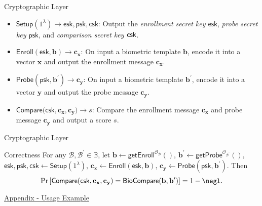\begin{frame}{Cryptographic Layer}

\pause
\begin{itemize}

	\item $\textsf{Setup}(1^\lambda) \to \textsf{esk}, \textsf{psk}, \textsf{csk}$: Output the \emph{enrollment secret key $\textsf{esk}$}, \emph{probe secret key $\textsf{psk}$}, and \emph{comparison secret key $\sf csk$}.
	\pause

	\item $\textsf{Enroll}(\textsf{esk}, \mathbf{b}) \to \mathbf{c_x}$: On input a biometric template $\mathbf{b}$, encode it into a vector $\mathbf{x}$ and output the enrollment message $\mathbf{c_x}$.
	\pause

	\item $\textsf{Probe}(\textsf{psk}, \mathbf{b}^\prime) \to \mathbf{c_y}$: On input a biometric template $\mathbf{b}^\prime$, encode it into a vector $\mathbf{y}$ and output the probe message $\mathbf{c_y}$.
	\pause

	\item $\textsf{Compare}(\textsf{csk}, \mathbf{c_x}, \mathbf{c_y)} \to s$: Compare the enrollment message $\mathbf{c_x}$ and probe message $\mathbf{c_y}$ and output a score $s$.

\end{itemize}

\end{frame}


\begin{frame}{Cryptographic Layer}

\begin{block}{Correctness} 
For any $\mathcal{B}, \mathcal{B}^\prime \in \mathbb{B}$, \pause
let $\mathbf{b} \gets \textsf{getEnroll}^{\mathcal{O}_\mathcal{B}}()$, $\mathbf{b}^\prime \gets \textsf{getProbe}^{\mathcal{O}_{\mathcal{B}^\prime}}()$, \pause
$\textsf{esk}, \textsf{psk}, \textsf{csk} \gets \textsf{Setup}(1^\lambda)$,
$\mathbf{c_x} \gets \textsf{Enroll}(\textsf{esk}, \mathbf{b})$,
$\mathbf{c_y} \gets \textsf{Probe}(\textsf{psk}, \mathbf{b}^\prime)$.
\pause
Then
	\[
		\Pr \left [
			\textsf{Compare}(\textsf{csk}, \mathbf{c_x}, \mathbf{c_y}) = \textsf{BioCompare}(\mathbf{b}, \mathbf{b}^\prime)
		\right ] = 1 - \negl.
	\]
\end{block}

\medskip
\pause

\hyperlink{sec:appendix-usage}{Appendix - Usage Example}

\end{frame}

